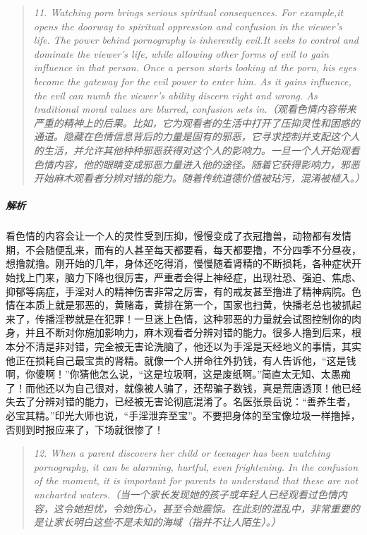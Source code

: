 \begin{quote}\it
    11. Watching porn brings serious spiritual consequences. For example,it opens the doorway to spiritual oppression and confusion in the viewer's life. The power behind pornography is inherently evil.It seeks to control and dominate the viewer's life, while allowing other forms of evil to gain influence in that person. Once a person starts looking at the porn, his eyes become the gateway for the evil power to enter him. As it gains influence, the evil can numb the viewer's ability discern right and wrong. As traditional moral values are blurred, confusion sets in.（观看色情内容带来严重的精神上的后果。比如，它为观看者的生活中打开了压抑灵性和困惑的通道。隐藏在色情信息背后的力量是固有的邪恶，它寻求控制并支配这个人的生活，并允许其他种种邪恶获得对这个人的影响力。一旦一个人开始观看色情内容，他的眼睛变成邪恶力量进入他的途径。随着它获得影响力，邪恶开始麻木观看者分辨对错的能力。随着传统道德价值被玷污，混淆被植入。）
\end{quote}

\subparagraph{解析} 看色情的内容会让一个人的灵性受到压抑，慢慢变成了衣冠撸兽，动物都有发情期，不会随便乱来，而有的人甚至每天都要看，每天都要撸，不分四季不分昼夜，想撸就撸。刚开始的几年，身体还吃得消，慢慢随着肾精的不断损耗，各种症状开始找上门来，脑力下降也很厉害，严重者会得上神经症，出现社恐、强迫、焦虑、抑郁等病症，手淫对人的精神伤害非常之厉害，有的戒友甚至撸进了精神病院。色情在本质上就是邪恶的，黄赌毒，黄排在第一个，国家也扫黄，快播老总也被抓起来了，传播淫秽就是在犯罪！一旦迷上色情，这种邪恶的力量就会试图控制你的肉身，并且不断对你施加影响力，麻木观看者分辨对错的能力。很多人撸到后来，根本分不清是非对错，完全被无害论洗脑了，他还以为手淫是天经地义的事情，其实他正在损耗自己最宝贵的肾精。就像一个人拼命往外扔钱，有人告诉他，“这是钱啊，你傻啊！”你猜他怎么说，“这是垃圾啊，这是废纸啊。”简直太无知、太愚痴了！而他还以为自己很对，就像被人骗了，还帮骗子数钱，真是荒唐透顶！他已经失去了分辨对错的能力，已经被无害论彻底混淆了。名医张景岳说：“善养生者，必宝其精。”印光大师也说，“手淫泄弃至宝”。不要把身体的至宝像垃圾一样撸掉，否则到时报应来了，下场就很惨了！

\begin{quote}\it
    12. When a parent discovers her child or teenager has been watching pornography, it can be alarming, hurtful, even frightening. In the confusion of the moment, it is important for parents to understand that these are not uncharted waters.（当一个家长发现她的孩子或年轻人已经观看过色情内容，这令她担忧，令她伤心，甚至令她震惊。在此刻的混乱中，非常重要的是让家长明白这些不是未知的海域（指并不让人陌生）。）
\end{quote}

